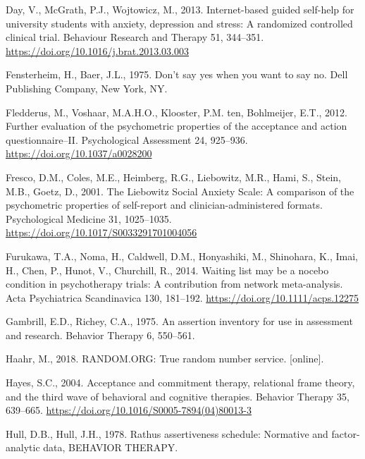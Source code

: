 \documentclass[3p]{elsarticle} %
\newlength{\cslhangindent}
\newlength{\cslentryspacingunit} %
\newenvironment{CSLReferences}[2] %
 {%
  \setlength{\parindent}{0pt}
  \ifodd #1
  \let\oldpar\par
  \def\par{\hangindent=\cslhangindent\oldpar}
  \fi
  \setlength{\parskip}{#2\cslentryspacingunit}
 }%
 {}
\begin{document}
\begin{CSLReferences}{1}{0}
\leavevmode{}%
Day, V., McGrath, P.J., Wojtowicz, M., 2013. {Internet-based guided
self-help for university students with anxiety, depression and stress: A
randomized controlled clinical trial}. Behaviour Research and Therapy
51, 344--351. \url{https://doi.org/10.1016/j.brat.2013.03.003}

\leavevmode{}%
Fensterheim, H., Baer, J.L., 1975. {Don't say yes when you want to say
no}. Dell Publishing Company, New York, NY.

\leavevmode{}%
Fledderus, M., Voshaar, M.A.H.O., Klooster, P.M. ten, Bohlmeijer, E.T.,
2012. Further evaluation of the psychometric properties of the
acceptance and action questionnaire--II. Psychological Assessment 24,
925--936. \url{https://doi.org/10.1037/a0028200}

\leavevmode{}%
Fresco, D.M., Coles, M.E., Heimberg, R.G., Liebowitz, M.R., Hami, S.,
Stein, M.B., Goetz, D., 2001. {The Liebowitz Social Anxiety Scale: A
comparison of the psychometric properties of self-report and
clinician-administered formats}. Psychological Medicine 31, 1025--1035.
\url{https://doi.org/10.1017/S0033291701004056}

\leavevmode{}%
Furukawa, T.A., Noma, H., Caldwell, D.M., Honyashiki, M., Shinohara, K.,
Imai, H., Chen, P., Hunot, V., Churchill, R., 2014. Waiting list may be
a nocebo condition in psychotherapy trials: A contribution from network
meta-analysis. Acta Psychiatrica Scandinavica 130, 181--192.
\url{https://doi.org/10.1111/acps.12275}

\leavevmode{}%
Gambrill, E.D., Richey, C.A., 1975. {An assertion inventory for use in
assessment and research}. Behavior Therapy 6, 550--561.

\leavevmode{}%
Haahr, M., 2018. {RANDOM.ORG:} True random number service. {[}online{]}.

\leavevmode{}%
Hayes, S.C., 2004. {Acceptance and commitment therapy, relational frame
theory, and the third wave of behavioral and cognitive therapies}.
Behavior Therapy 35, 639--665.
\url{https://doi.org/10.1016/S0005-7894(04)80013-3}

\leavevmode{}%
Hull, D.B., Hull, J.H., 1978. Rathus assertiveness schedule: Normative
and factor-analytic data, BEHAVIOR THERAPY.


\end{CSLReferences}
\end{document}
